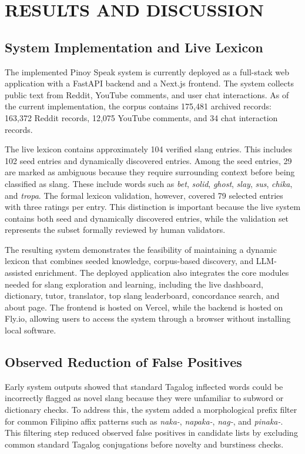 \section{RESULTS AND DISCUSSION}

\subsection{System Implementation and Live Lexicon}

The implemented Pinoy Speak system is currently deployed as a full-stack web application with a FastAPI backend and a Next.js frontend. The system collects public text from Reddit, YouTube comments, and user chat interactions. As of the current implementation, the corpus contains 175,481 archived records: 163,372 Reddit records, 12,075 YouTube comments, and 34 chat interaction records.

The live lexicon contains approximately 104 verified slang entries. This includes 102 seed entries and dynamically discovered entries. Among the seed entries, 29 are marked as ambiguous because they require surrounding context before being classified as slang. These include words such as \textit{bet}, \textit{solid}, \textit{ghost}, \textit{slay}, \textit{sus}, \textit{chika}, and \textit{tropa}. The formal lexicon validation, however, covered 79 selected entries with three ratings per entry. This distinction is important because the live system contains both seed and dynamically discovered entries, while the validation set represents the subset formally reviewed by human validators.

The resulting system demonstrates the feasibility of maintaining a dynamic lexicon that combines seeded knowledge, corpus-based discovery, and LLM-assisted enrichment. The deployed application also integrates the core modules needed for slang exploration and learning, including the live dashboard, dictionary, tutor, translator, top slang leaderboard, concordance search, and about page. The frontend is hosted on Vercel, while the backend is hosted on Fly.io, allowing users to access the system through a browser without installing local software.

\subsection{Observed Reduction of False Positives}

Early system outputs showed that standard Tagalog inflected words could be incorrectly flagged as novel slang because they were unfamiliar to subword or dictionary checks. To address this, the system added a morphological prefix filter for common Filipino affix patterns such as \textit{naka-}, \textit{napaka-}, \textit{nag-}, and \textit{pinaka-}. This filtering step reduced observed false positives in candidate lists by excluding common standard Tagalog conjugations before novelty and burstiness checks.

